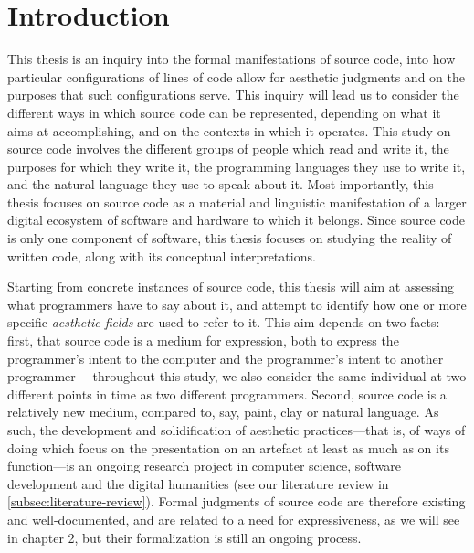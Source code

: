 \chapter{Introduction}
\label{chap:introduction}

This thesis is an inquiry into the formal manifestations of source code, into how particular configurations of lines of code allow for aesthetic judgments and on the purposes that such configurations serve. This inquiry will lead us to consider the different ways in which source code can be represented, depending on what it aims at accomplishing, and on the contexts in which it operates.
This study on source code involves the different groups of people which read and write it, the purposes for which they write it, the programming languages they use to write it, and the natural language they use to speak about it. Most importantly, this thesis focuses on source code as a material and linguistic manifestation of a larger digital ecosystem of software and hardware to which it belongs. Since source code is only one component of software, this thesis focuses on studying the reality of written code, along with its conceptual interpretations.

Starting from concrete instances of source code, this thesis will aim at assessing what programmers have to say about it, and attempt to identify how one or more specific \emph{aesthetic fields} are used to refer to it. This aim depends on two facts: first, that source code is a medium for expression, both to express the programmer's intent to the computer \citep{dijkstra_craftsman_1982} and the programmer's intent to another programmer \citep{abelson_structure_1979}—throughout this study, we also consider the same individual at two different points in time as two different programmers. Second, source code is a relatively new medium, compared to, say, paint, clay or natural language. As such, the development and solidification of aesthetic practices—that is, of ways of doing which focus on the presentation on an artefact at least as much as on its function—is an ongoing research project in computer science, software development and the digital humanities (see our literature review in \ref{subsec:literature-review}). Formal judgments of source code are therefore existing and well-documented, and are related to a need for expressiveness, as we will see in chapter 2, but their formalization is still an ongoing process.

